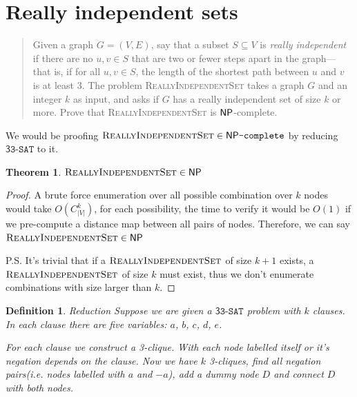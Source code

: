 
\newtheorem{theorem}{Theorem}
\newtheorem{lemma}[theorem]{Lemma}
\newtheorem{definition}{Definition}[section]


\maketitle
\thispagestyle{firststyle}
\vspace{-2.0cm}

\newcommand{\RIS}{\textsc{ReallyIndependentSet}}
\newcommand{\NPC}{\mathsf{NP}\texttt{-complete}}
\newcommand{\tSAT}{\mathsf{3}\texttt{3-SAT}}

\section{Really independent sets}
    \begin{quote}
    Given a graph $G = (V,E)$, say that a subset $S \subseteq V$ is \emph{really independent} if there are no $u,v \in S$ that are two or fewer steps apart in the graph---that is, if for all $u,v \in S$, the length of the shortest path
    between $u$ and $v$ is at least 3.
    The problem \textsc{ReallyIndependentSet} takes a graph $G$ and an integer $k$ as input, and asks if $G$ has a really independent set of size $k$ or more.
    Prove that \textsc{ReallyIndependentSet} is $\mathsf{NP}$-complete.
    \end{quote}

We would be proofing $\RIS \in \NPC$ by reducing $\tSAT$ to it. 

\begin{theorem}
    $\RIS \in \NP $
\end{theorem}

\begin{proof}
    A brute force enumeration over all possible combination over $k$ nodes would take $O(C^k_{|V|})$, for each possibility, the time to verify it would be $O(1)$ if we pre-compute a distance map between all pairs of nodes.
    Therefore, we can say $\RIS \in \NP$
    
    P.S. It's trivial that if a $\RIS$ of size $k+1$ exists, a $\RIS$ of size $k$ must exist, thus we don't enumerate combinations with size larger than $k$.
\end{proof}

\begin{definition}{Reduction}
    Suppose we are given a $\tSAT$ problem with $k$ clauses. In each clause there are five variables: $a$, $b$, $c$, $d$, $e$.

    For each clause we construct a 3-clique. With each node labelled itself or it's negation depends on the clause.
    Now we have $k$ 3-cliques, find all negation pairs(i.e. nodes labelled with $a$ and $-a$), add a dummy node $D$ and connect $D$ with both nodes.
\end{definition}

